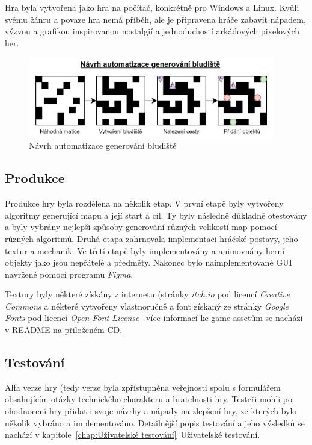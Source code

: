 Hra byla vytvořena jako hra na počítač, konkrétně pro Windows a Linux. Kvůli svému žánru a povaze hra nemá příběh, ale je připravena hráče zabavit nápadem, výzvou a grafikou inspirovanou nostalgií a jednoduchostí arkádových pixelových her.

\begin{figure}[t]
    \centering
    \includegraphics[width=0.96\textwidth]{obrazky-figures/ch3/navrh_generovani.png}
    \caption{Návrh automatizace generování bludiště}
    \label{fig:navrh_generovani}
\end{figure}

\subsection*{Produkce}
Produkce hry byla rozdělena na několik etap. V první etapě byly vytvořeny algoritmy generující mapu a její start a cíl. Ty byly následně důkladně otestovány a byly vybrány nejlepší způsoby generování různých velikostí map pomocí různých algoritmů. Druhá etapa zahrnovala implementaci hráčské postavy, jeho textur a mechanik. Ve třetí etapě byly implementovány a animovnány herní objekty jako jsou nepřátelé a předměty. Nakonec bylo naimplementované GUI navržené pomocí programu \textit{Figma}.

Textury byly některé získány z internetu (stránky \textit{itch.io} pod licencí \textit{Creative Commons} a některé vytvořeny vlastnoručně a font získaný ze stránky \textit{Google Fonts} pod licencí \textit{Open Font License}\,--\,více informací ke game assetům se nachází v README na přiloženém CD.

\subsection*{Testování}
Alfa verze hry (tedy  verze byla zpřístupněna veřejnosti spolu s formulářem obsahujícím otázky technického charakteru a hratelnosti hry. Testeři mohli po ohodnocení hry přidat i svoje návrhy a nápady na zlepšení hry, ze kterých bylo několik vybráno a implementováno. Detailnější popis testování a jeho výsledků se nachází v kapitole~\ref{chap:Uživatelské testování}~Uživatelské testování.



